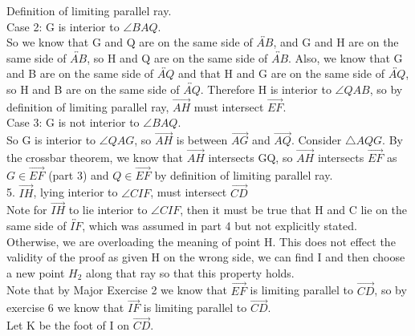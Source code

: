 \documentclass[12pt,letterpaper]{article}
\begin{document}
Definition of limiting parallel ray. \\

\noindent Case 2: G is interior to $\angle BAQ$.\\

So we know that G and Q are on the same side of $\overleftrightarrow{AB}$, and G and H are on the same side of $\overleftrightarrow{AB}$, so H and Q are on the same side of $\overleftrightarrow{AB}$.  Also, we know that G and B are on the same side of $\overleftrightarrow{AQ}$ and that H and G are on the same side of $\overleftrightarrow{AQ}$, so H and B are on the same side of $\overleftrightarrow{AQ}$.  Therefore H is interior to $\angle QAB$, so by definition of limiting parallel ray, $\overrightarrow{AH}$ must intersect $\overrightarrow{EF}$. \\

\noindent Case 3: G is not interior to $\angle BAQ$. \\

So G is interior to $\angle QAG$, so $\overrightarrow{AH}$ is between $\overrightarrow{AG}$ and $\overrightarrow{AQ}$.  Consider $\triangle AQG$.  By the crossbar theorem, we know that $\overrightarrow{AH}$ intersects GQ, so $\overrightarrow{AH}$ intersects $\overrightarrow{EF}$ as $G\in \overrightarrow{EF}$ (part 3) and $Q\in \overrightarrow{EF}$ by definition of limiting parallel ray.  \\




5. $\overrightarrow{IH}$, lying interior to $\angle CIF$, must intersect $\overrightarrow{CD}$\\

Note for $\overrightarrow{IH}$ to lie interior to $\angle CIF$, then it must be true that H and C lie on the same side of $\overleftrightarrow{IF}$, which was assumed in part 4 but not explicitly stated. Otherwise, we are overloading the meaning of point H.  This does not effect the validity of the proof as given H on the wrong side, we can find I and then choose a new point $H_2$ along that ray so that this property holds.\\

Note that by Major Exercise 2 we know that $\overrightarrow{EF}$ is limiting parallel to $\overrightarrow{CD}$, so by exercise 6 we know that $\overrightarrow{IF}$ is limiting parallel to $\overrightarrow{CD}$.\\

Let K be the foot of I on $\overrightarrow{CD}$. \\
\end{document}
